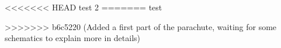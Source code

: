 <<<<<<< HEAD
test 2
=======
test


>>>>>>> b6c5220 (Added a first part of the parachute, waiting for some schematics to explain more in details)
